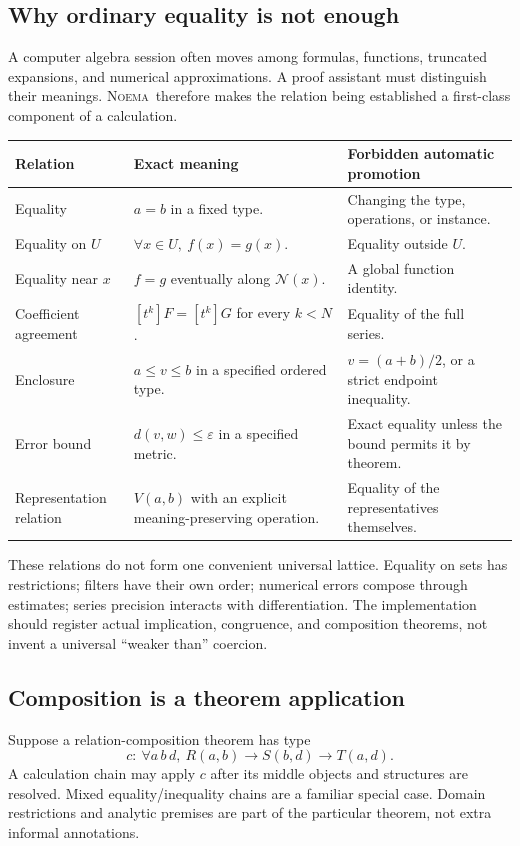 \documentclass[11pt,a4paper]{article}
\newcommand{\Noema}{\textsc{Noema}}
\theoremstyle{remark}\newtheorem{example}[proposition]{Example}
\begin{document}
\subsection{Why ordinary equality is not enough}
A computer algebra session often moves among formulas, functions, truncated expansions, and numerical approximations. A proof assistant must distinguish their meanings. \Noema\ therefore makes the relation being established a first-class component of a calculation.
\begin{longtable}{@{}P{.23\textwidth}P{.40\textwidth}P{.29\textwidth}@{}}
\toprule
Relation & Exact meaning & Forbidden automatic promotion \\
\midrule\endhead
Equality & $a=b$ in a fixed type. & Changing the type, operations, or instance.\\
Equality on $U$ & $\forall x\in U,\ f(x)=g(x)$. & Equality outside $U$.\\
Equality near $x$ & $f=g$ eventually along $\mathcal N(x)$. & A global function identity.\\
Coefficient agreement & $[t^k]F=[t^k]G$ for every $k<N$. & Equality of the full series.\\
Enclosure & $a\leq v\leq b$ in a specified ordered type. & $v=(a+b)/2$, or a strict endpoint inequality.\\
Error bound & $d(v,w)\leq\varepsilon$ in a specified metric. & Exact equality unless the bound permits it by theorem.\\
Representation relation & $V(a,b)$ with an explicit meaning-preserving operation. & Equality of the representatives themselves.\\
\bottomrule
\end{longtable}
These relations do not form one convenient universal lattice. Equality on sets has restrictions; filters have their own order; numerical errors compose through estimates; series precision interacts with differentiation. The implementation should register actual implication, congruence, and composition theorems, not invent a universal ``weaker than'' coercion.

\subsection{Composition is a theorem application}
Suppose a relation-composition theorem has type
\[
 c:\ \forall a\,b\,d,\ R(a,b)\to S(b,d)\to T(a,d).
\]
A calculation chain may apply $c$ after its middle objects and structures are resolved. Mixed equality/inequality chains are a familiar special case. Domain restrictions and analytic premises are part of the particular theorem, not extra informal annotations.
\end{document}
